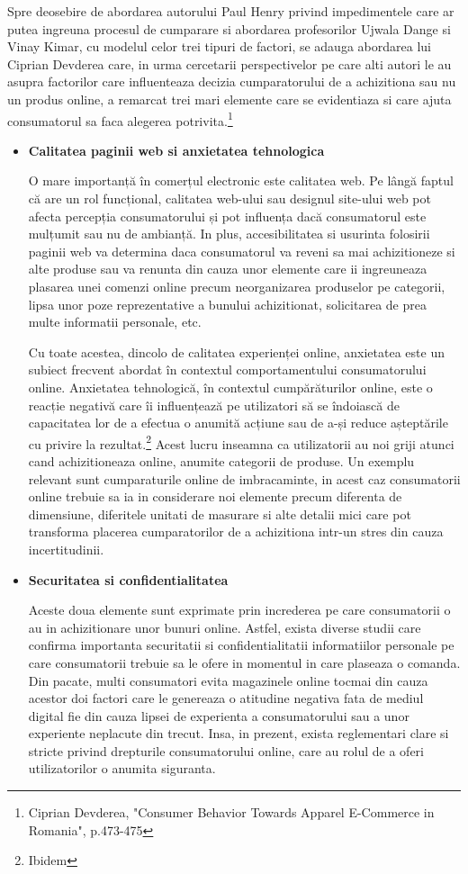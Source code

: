\documentclass[a4paper, 12pt]{article}
\begin{document}
	\quad Spre deosebire de abordarea autorului Paul Henry privind impedimentele care ar putea ingreuna procesul de cumparare si abordarea profesorilor Ujwala Dange si Vinay Kimar, cu modelul celor trei tipuri de factori, se adauga abordarea lui Ciprian Devderea care, in urma cercetarii perspectivelor pe care alti autori le au asupra factorilor care influenteaza decizia cumparatorului de a achizitiona sau nu un produs online, a remarcat trei mari elemente care se evidentiaza si care ajuta consumatorul sa faca alegerea potrivita.\footnote{Ciprian Devderea, "Consumer Behavior Towards Apparel E-Commerce in Romania", p.473-475 }
	\begin{itemize}
		\item\textbf{Calitatea paginii web si anxietatea tehnologica} 
		
		\quad O mare importanță în comerțul electronic este calitatea web. Pe lângă faptul că are un rol funcțional, calitatea web-ului sau designul site-ului web pot afecta percepția consumatorului și pot influența dacă consumatorul este mulțumit sau nu de ambianță. In plus, accesibilitatea si usurinta folosirii paginii web va determina daca consumatorul va reveni sa mai achizitioneze si alte produse sau va renunta din cauza unor elemente care ii ingreuneaza plasarea unei comenzi online precum neorganizarea produselor pe categorii, lipsa unor poze reprezentative a bunului achizitionat, solicitarea de prea multe informatii personale, etc.
		
		\quad Cu toate acestea, dincolo de calitatea experienței online, anxietatea este un subiect frecvent abordat în contextul comportamentului consumatorului online. Anxietatea tehnologică, în contextul cumpărăturilor online, este o reacție negativă care îi influențează pe utilizatori să se îndoiască de capacitatea lor de a efectua o anumită acțiune sau de a-și reduce așteptările cu privire la rezultat.\footnote{Ibidem} Acest lucru inseamna ca utilizatorii au noi griji atunci cand achizitioneaza online, anumite categorii de produse. Un exemplu relevant sunt cumparaturile online de imbracaminte, in acest caz consumatorii online trebuie sa ia in considerare noi elemente precum diferenta de dimensiune, diferitele unitati de masurare si alte detalii mici care pot transforma placerea cumparatorilor de a achizitiona intr-un stres din cauza incertitudinii.
		
		\item\textbf{Securitatea si confidentialitatea}
		
		\quad Aceste doua elemente sunt exprimate prin increderea pe care consumatorii o au in achizitionare unor bunuri online. Astfel, exista diverse studii care confirma importanta securitatii si confidentialitatii informatiilor personale pe care consumatorii trebuie sa le ofere in momentul in care plaseaza o comanda. Din pacate, multi consumatori evita magazinele online tocmai din cauza acestor doi factori care le genereaza o atitudine negativa fata de mediul digital fie din cauza lipsei de experienta a consumatorului sau a unor experiente neplacute din trecut. Insa, in prezent, exista reglementari clare si stricte privind drepturile consumatorului online, care au rolul de a oferi utilizatorilor o anumita siguranta.
		

\end{itemize}
\end{document}
